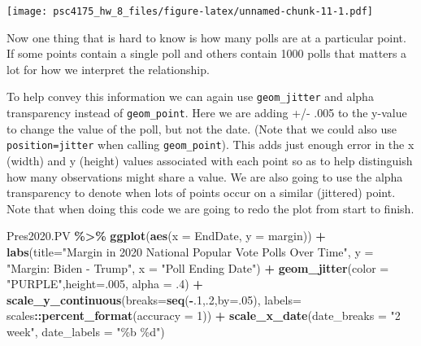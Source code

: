 \documentclass[
]{article}
\newenvironment{Shaded}{\begin{snugshade}}{\end{snugshade}}
\newcommand{\AttributeTok}[1]{\textcolor[rgb]{0.13,0.29,0.53}{#1}}
\newcommand{\DecValTok}[1]{\textcolor[rgb]{0.00,0.00,0.81}{#1}}
\newcommand{\FunctionTok}[1]{\textcolor[rgb]{0.13,0.29,0.53}{\textbf{#1}}}
\newcommand{\NormalTok}[1]{#1}
\newcommand{\SpecialCharTok}[1]{\textcolor[rgb]{0.81,0.36,0.00}{\textbf{#1}}}
\newcommand{\StringTok}[1]{\textcolor[rgb]{0.31,0.60,0.02}{#1}}
\begin{document}
\texttt{[image: psc4175\_hw\_8\_files/figure-latex/unnamed-chunk-11-1.pdf]}

Now one thing that is hard to know is how many polls are at a particular
point. If some points contain a single poll and others contain 1000
polls that matters a lot for how we interpret the relationship.

To help convey this information we can again use \texttt{geom\_jitter}
and alpha transparency instead of \texttt{geom\_point}. Here we are
adding +/- .005 to the y-value to change the value of the poll, but not
the date. (Note that we could also use \texttt{position=jitter} when
calling \texttt{geom\_point}). This adds just enough error in the x
(width) and y (height) values associated with each point so as to help
distinguish how many observations might share a value. We are also going
to use the alpha transparency to denote when lots of points occur on a
similar (jittered) point. Note that when doing this code we are going to
redo the plot from start to finish.

\begin{Shaded}
\begin{Highlighting}[]
\NormalTok{Pres2020.PV }\SpecialCharTok{\%\textgreater{}\%}
  \FunctionTok{ggplot}\NormalTok{(}\FunctionTok{aes}\NormalTok{(}\AttributeTok{x =}\NormalTok{ EndDate, }\AttributeTok{y =}\NormalTok{ margin)) }\SpecialCharTok{+} 
  \FunctionTok{labs}\NormalTok{(}\AttributeTok{title=}\StringTok{"Margin in 2020 National Popular Vote Polls Over Time"}\NormalTok{,}
       \AttributeTok{y =} \StringTok{"Margin: Biden {-} Trump"}\NormalTok{,}
       \AttributeTok{x =} \StringTok{"Poll Ending Date"}\NormalTok{) }\SpecialCharTok{+} 
    \FunctionTok{geom\_jitter}\NormalTok{(}\AttributeTok{color =} \StringTok{"PURPLE"}\NormalTok{,}\AttributeTok{height=}\NormalTok{.}\DecValTok{005}\NormalTok{, }\AttributeTok{alpha =}\NormalTok{ .}\DecValTok{4}\NormalTok{) }\SpecialCharTok{+}
    \FunctionTok{scale\_y\_continuous}\NormalTok{(}\AttributeTok{breaks=}\FunctionTok{seq}\NormalTok{(}\SpecialCharTok{{-}}\NormalTok{.}\DecValTok{1}\NormalTok{,.}\DecValTok{2}\NormalTok{,}\AttributeTok{by=}\NormalTok{.}\DecValTok{05}\NormalTok{),}
                     \AttributeTok{labels=}\NormalTok{ scales}\SpecialCharTok{::}\FunctionTok{percent\_format}\NormalTok{(}\AttributeTok{accuracy =} \DecValTok{1}\NormalTok{)) }\SpecialCharTok{+}
    \FunctionTok{scale\_x\_date}\NormalTok{(}\AttributeTok{date\_breaks =} \StringTok{"2 week"}\NormalTok{, }\AttributeTok{date\_labels =} \StringTok{"\%b \%d"}\NormalTok{) }
\end{Highlighting}
\end{Shaded}
\end{document}
